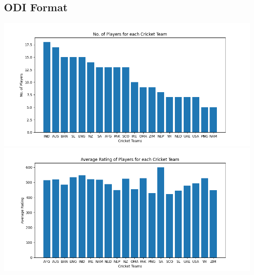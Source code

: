 \documentclass{article}
\begin{document}
\begin{normalsize}
            \subsection{ODI Format}\label{subsec:odi}
                \includegraphics[scale=0.7]{overall_odi-1}
                \vspace{1em}\\
                \includegraphics[scale=0.7]{overall_odi-2}
            \newpage

\end{normalsize}
\end{document}
